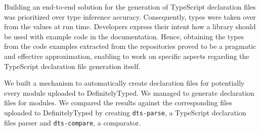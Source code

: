 \documentclass[sigconf]{acmart}
\begin{document}
Building an end-to-end solution for the generation of TypeScript declaration files was
prioritized over type inference accuracy. Consequently, types were taken over from the
values at run time. Developers express their intent how a library should be used with
example code in the documentation. Hence,
obtaining the types from the code examples extracted from the repositories proved to be a
pragmatic and effective approximation, enabling to work on specific aspects regarding the
TypeScript declaration file generation itself.

We built a mechanism to automatically create declaration files for potentially every
module uploaded to DefinitelyTyped. We managed to generate declaration files for
\CountModulesGeneratedDeclarationFile{} modules. We compared the results against the corresponding 
files uploaded to
DefinitelyTyped by creating \texttt{dts-parse}, a TypeScript declaration files parser and
\texttt{dts-compare}, a comparator.





\end{document}
